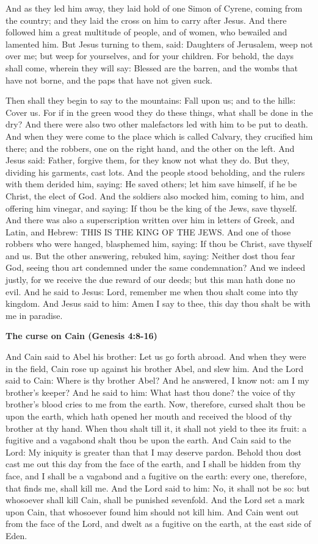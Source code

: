 And as they led him away, they laid hold of one Simon of Cyrene, coming from the country; and they laid the cross on him to carry after Jesus. And there followed him a great multitude of people, and of women, who bewailed and lamented him. But Jesus turning to them, said: Daughters of Jerusalem, weep not over me; but weep for yourselves, and for your children. For behold, the days shall come, wherein they will say: Blessed are the barren, and the wombs that have not borne, and the paps that have not given suck.

Then shall they begin to say to the mountains: Fall upon us; and to the hills: Cover us. For if in the green wood they do these things, what shall be done in the dry? And there were also two other malefactors led with him to be put to death. And when they were come to the place which is called Calvary, they crucified him there; and the robbers, one on the right hand, and the other on the left. And Jesus said: Father, forgive them, for they know not what they do. But they, dividing his garments, cast lots. And the people stood beholding, and the rulers with them derided him, saying: He saved others; let him save himself, if he be Christ, the elect of God. And the soldiers also mocked him, coming to him, and offering him vinegar, and saying: If thou be the king of the Jews, save thyself. And there was also a superscription written over him in letters of Greek, and Latin, and Hebrew: THIS IS THE KING OF THE JEWS. And one of those robbers who were hanged, blasphemed him, saying: If thou be Christ, save thyself and us. But the other answering, rebuked him, saying: Neither dost thou fear God, seeing thou art condemned under the same condemnation? And we indeed justly, for we receive the due reward of our deeds; but this man hath done no evil. And he said to Jesus: Lord, remember me when thou shalt come into thy kingdom. And Jesus said to him: Amen I say to thee, this day thou shalt be with me in paradise.

\textbf{The curse on Cain (Genesis 4:8-16)}

And Cain said to Abel his brother: Let us go forth abroad. And when they were in the field, Cain rose up against his brother Abel, and slew him. And the Lord said to Cain: Where is thy brother Abel? And he answered, I know not: am I my brother's keeper? And he said to him: What hast thou done? the voice of thy brother's blood cries to me from the earth. Now, therefore, cursed shalt thou be upon the earth, which hath opened her mouth and received the blood of thy brother at thy hand. When thou shalt till it, it shall not yield to thee its fruit: a fugitive and a vagabond shalt thou be upon the earth. And Cain said to the Lord: My iniquity is greater than that I may deserve pardon. Behold thou dost cast me out this day from the face of the earth, and I shall be hidden from thy face, and I shall be a vagabond and a fugitive on the earth: every one, therefore, that finds me, shall kill me. And the Lord said to him: No, it shall not be so: but whosoever shall kill Cain, shall be punished sevenfold. And the Lord set a mark upon Cain, that whosoever found him should not kill him. And Cain went out from the face of the Lord, and dwelt as a fugitive on the earth, at the east side of Eden.

